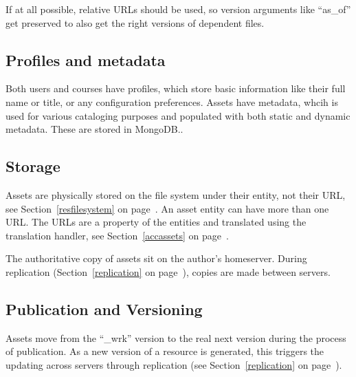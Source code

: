If at all possible, relative URLs should be used, so version arguments like ``as\_of'' get preserved to also get the right versions of dependent files.
\subsection{Profiles and metadata}
Both users and courses have profiles, which store basic information like their full name or title, or any configuration preferences. Assets have metadata, whcih is used for various cataloging purposes and populated with both static and dynamic metadata. These are stored in MongoDB..
\subsection{Storage}
Assets are physically stored on the file system under their entity, not their URL,  see Section~\ref{resfilesystem} on page~\pageref{resfilesystem}. An asset entity can have more than one URL. The URLs are a property of the entities and translated using the translation handler, see Section~\ref{accassets} on page~\pageref{accassets}.

The authoritative copy of assets sit on the author's homeserver. During replication (Section~\ref{replication} on page~\pageref{replication}), copies are made between servers.
\subsection{Publication and Versioning}
Assets move from the ``\_wrk'' version to the real next version during the process of publication.
 As a new version of a resource is generated, this triggers the updating across servers through replication (see Section~\ref{replication} on page~\pageref{replication}).
